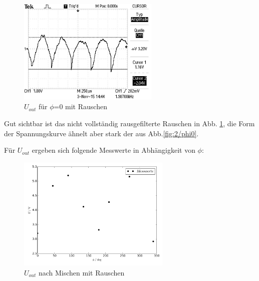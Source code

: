 \begin{figure}[H]
  \centering
  \includegraphics[angle=90,width=0.6\textwidth, height=0.3\textwidth]{graphics/ALL0039/F0039TEK.jpg}
  \caption{$U_{out}$ für $\phi$=0 mit Rauschen}
  \label{fig:3/phi0}
\end{figure}

Gut sichtbar ist das nicht vollständig rausgefilterte Rauschen in Abb.
\ref{fig:3/phi0}, die Form der
Spannungskurve ähnelt aber stark der aus Abb.\ref{fig:2/phi0}.

\newpage
Für $U_{out}$ ergeben sich folgende Messwerte in Abhängigkeit von $\phi$:

\begin{figure}[H]
  \centering
  \includegraphics[width=0.65\textwidth, height=0.35\textwidth]{plot3u.pdf}
  \caption{$U_{out}$ nach Mischen mit Rauschen}
  \label{fig:plot3u}
\end{figure}

